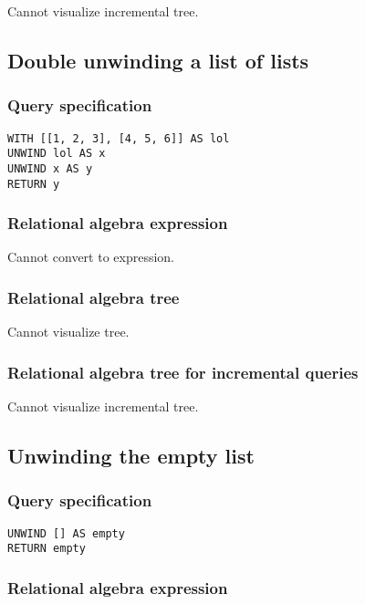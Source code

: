 Cannot visualize incremental tree.

\subsection{Double unwinding a list of lists}

\subsubsection*{Query specification}

\begin{lstlisting}
WITH [[1, 2, 3], [4, 5, 6]] AS lol
UNWIND lol AS x
UNWIND x AS y
RETURN y
\end{lstlisting}

\subsubsection*{Relational algebra expression}

Cannot convert to expression.

\subsubsection*{Relational algebra tree}

Cannot visualize tree.

\subsubsection*{Relational algebra tree for incremental queries}

Cannot visualize incremental tree.

\subsection{Unwinding the empty list}

\subsubsection*{Query specification}

\begin{lstlisting}
UNWIND [] AS empty
RETURN empty
\end{lstlisting}

\subsubsection*{Relational algebra expression}

